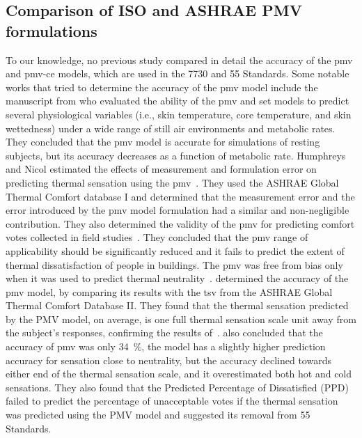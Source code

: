 \subsection{Comparison of ISO and ASHRAE PMV formulations}\label{subsec:comparision-of-pmv-formulations}
To our knowledge, no previous study compared in detail the accuracy of the \ac{pmv} and \ac{pmv-ce} models, which are used in the \gls{7730} and \gls{55} Standards.
Some notable works that tried to determine the accuracy of the \ac{pmv} model include the manuscript from  who evaluated the ability of the \ac{pmv} and \ac{set} models to predict several physiological variables (i.e., skin temperature, core temperature, and skin wettedness) under a wide range of still air environments and metabolic rates.
They concluded that the \ac{pmv} model is accurate for simulations of resting subjects, but its accuracy decreases as a function of metabolic rate.
Humphreys and Nicol estimated the effects of measurement and formulation error on predicting thermal sensation using the \ac{pmv}~\cite{Humphreys2000}.
They used the ASHRAE Global Thermal Comfort database I and determined that the measurement error and the error introduced by the \ac{pmv} model formulation had a similar and non-negligible contribution.
They also determined the validity of the \ac{pmv} for predicting comfort votes collected in field studies~\cite{Humphreys2002}.
They concluded that the \ac{pmv} range of applicability should be significantly reduced and it fails to predict the extent of thermal dissatisfaction of people in buildings.
The \ac{pmv} was free from bias only when it was used to predict thermal neutrality~\cite{Humphreys2002}.
 determined the accuracy of the \ac{pmv} model, by comparing its results with the \ac{tsv} from the ASHRAE Global Thermal Comfort Database II.
They found that the thermal sensation predicted by the PMV model, on average, is one full thermal sensation scale unit away from the subject’s responses, confirming the results of~.
 also concluded that the accuracy of \ac{pmv} was only \qty{34}{\percent}, the model has a slightly higher prediction accuracy for sensation close to neutrality, but the accuracy declined towards either end of the thermal sensation scale, and it overestimated both hot and cold sensations.
They also found that the Predicted Percentage of Dissatisfied (PPD) failed to predict the percentage of unacceptable votes if the thermal sensation was predicted using the PMV model and suggested its removal from \gls{55} Standards.
